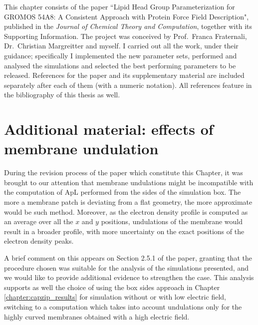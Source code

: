 This chapter consists of the paper ``Lipid Head Group Parameterization for GROMOS 54A8: A Consistent Approach with Protein Force Field Description", published in the \emph{Journal of Chemical Theory and Computation}, together with its Supporting Information. The project was conceived by Prof.\ Franca Fraternali, Dr.\ Christian Margreitter and myself. I carried out all the work, under their guidance; specifically I implemented the new parameter sets, performed and analysed the simulations and selected the best performing parameters to be released. References for the paper and its supplementary material are included separately after each of them (with a numeric notation). All references feature in the bibliography of this thesis as well.








\clearpage

\section{Additional material: effects of membrane undulation}

During the revision process of the paper which constitute this Chapter, it was brought to our attention that membrane undulations might be incompatible with the computation of ApL performed from the sides of the simulation box. The more a membrane patch is deviating from a flat geometry, the more approximate would be such method.
%
Moreover, as the electron density profile is computed as an average over all the $x$ and $y$ positions, undulations of the membrane would result in a broader profile, with more uncertainty on the exact positions of the electron density peaks.

A brief comment on this appears on Section 2.5.1 of the paper, granting that the procedure chosen was suitable for the analysis of the simulations presented, and we would like to provide additional evidence to strengthen the case.
%
This analysis supports as well the choice of using the box sides approach in Chapter \ref{chapter:capzip_results} for simulation without or with low electric field, switching to a computation which takes into account undulations only for the highly curved membranes obtained with a high electric field.


